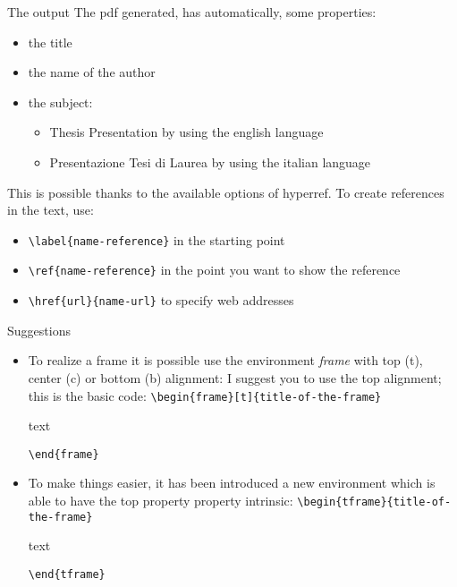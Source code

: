 \begin{frame}[t,fragile]{The output}
The pdf generated, has automatically, some properties:
\begin{itemize}
\item the title
\item the name of the author
\item the subject:
\begin{itemize}
\item Thesis Presentation by using the english language
\item Presentazione Tesi di Laurea by using the italian language
\end{itemize}
\end{itemize}
This is possible thanks to the available options of hyperref. To create references in the text, use:
\begin{itemize}
\item \verb!\label{name-reference}! in the starting point
\item \verb!\ref{name-reference}! in the point you want to show the reference
\item \verb!\href{url}{name-url}! to specify web addresses
\end{itemize}
\end{frame}


\begin{frame}[fragile]{Suggestions}
\begin{itemize}
\item To realize a frame it is possible use the environment \emph{frame} with top (t), center (c) or bottom (b) alignment: I suggest you to use the top alignment; this is the basic code:
\verb!\begin{frame}[t]{title-of-the-frame}!
\begin{flushleft}
text
\end{flushleft}
\verb!\end{frame}!
\item To make things easier, it has been introduced a new environment which is able to have the top property property intrinsic:
\verb!\begin{tframe}{title-of-the-frame}!
\begin{flushleft}
text
\end{flushleft}
\verb!\end{tframe}!
\end{itemize}
\end{frame}

